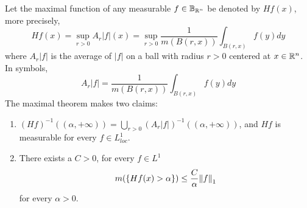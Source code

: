 \documentclass[../../main.tex]{subfiles}
\begin{document}
\providecommand{\local}{{L^{1}_{loc}}}
\providecommand{\lf}{{\mathcal{L}_f}}

\begin{wts}
Let the maximal function of any measurable $f\in{\mathbb{B}}_{\mathbb{R}^n}$ be denoted by $Hf(x)$, more precisely,
\[
Hf(x) = \sup_{r>0}A_r|f|(x) = \sup_{r>0}\dfrac{1}{m(B(r,x))}\int_{B(r,x)}f(y)dy
\]
where $A_r|f|$ is the average of $|f|$ on a ball with radius $r>0$ centered at $x\in{\mathbb{R}^n}$. In symbols,
\[A_r|f| = \dfrac{1}{m(B(r,x))}\int_{B(r,x)}f(y)dy\]
The maximal theorem makes two claims:
\begin{enumerate}
    \item $(Hf)^{-1}((\alpha,+\infty))=\bigcup\limits_{r>0}(A_r|f|)^{-1}((\alpha,+\infty))$, and $Hf$ is measurable for every $f\in\local$. 
    \item There exists a $C>0$, for every $f\in L^1$ \[
        m(\{Hf(x)>\alpha\})\leq \dfrac{C}{\alpha}\norm{f}_1
    \]
    for every $\alpha>0$.
\end{enumerate}
\end{wts}
\end{document}
